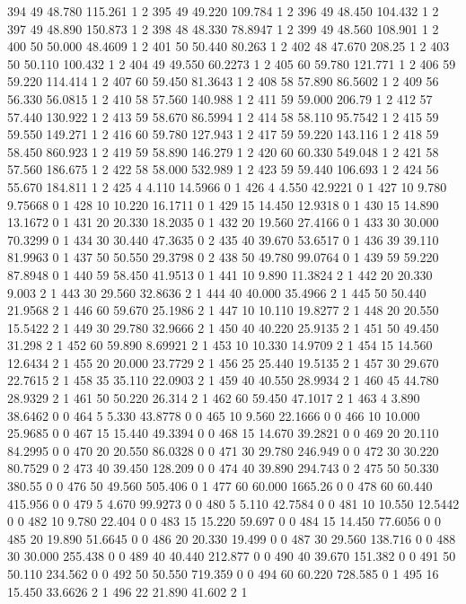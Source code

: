 {394 49 48.780 115.261 1 2
395 49 49.220 109.784 1 2
396 49 48.450 104.432 1 2
397 49 48.890 150.873 1 2
398 48 48.330 78.8947 1 2
399 49 48.560 108.901 1 2
400 50 50.000 48.4609 1 2
401 50 50.440 80.263 1 2
402 48 47.670 208.25 1 2
403 50 50.110 100.432 1 2
404 49 49.550 60.2273 1 2
405 60 59.780 121.771 1 2
406 59 59.220 114.414 1 2
407 60 59.450 81.3643 1 2
408 58 57.890 86.5602 1 2
409 56 56.330 56.0815 1 2
410 58 57.560 140.988 1 2
411 59 59.000 206.79 1 2
412 57 57.440 130.922 1 2
413 59 58.670 86.5994 1 2
414 58 58.110 95.7542 1 2
415 59 59.550 149.271 1 2
416 60 59.780 127.943 1 2
417 59 59.220 143.116 1 2
418 59 58.450 860.923 1 2
419 59 58.890 146.279 1 2
420 60 60.330 549.048 1 2
421 58 57.560 186.675 1 2
422 58 58.000 532.989 1 2
423 59 59.440 106.693 1 2
424 56 55.670 184.811 1 2
425 4 4.110 14.5966 0 1
426 4 4.550 42.9221 0 1
427 10 9.780 9.75668 0 1
428 10 10.220 16.1711 0 1
429 15 14.450 12.9318 0 1
430 15 14.890 13.1672 0 1
431 20 20.330 18.2035 0 1
432 20 19.560 27.4166 0 1
433 30 30.000 70.3299 0 1
434 30 30.440 47.3635 0 2
435 40 39.670 53.6517 0 1
436 39 39.110 81.9963 0 1
437 50 50.550 29.3798 0 2
438 50 49.780 99.0764 0 1
439 59 59.220 87.8948 0 1
440 59 58.450 41.9513 0 1
441 10 9.890 11.3824 2 1
442 20 20.330 9.003 2 1
443 30 29.560 32.8636 2 1
444 40 40.000 35.4966 2 1
445 50 50.440 21.9568 2 1
446 60 59.670 25.1986 2 1
447 10 10.110 19.8277 2 1
448 20 20.550 15.5422 2 1
449 30 29.780 32.9666 2 1
450 40 40.220 25.9135 2 1
451 50 49.450 31.298 2 1
452 60 59.890 8.69921 2 1
453 10 10.330 14.9709 2 1
454 15 14.560 12.6434 2 1
455 20 20.000 23.7729 2 1
456 25 25.440 19.5135 2 1
457 30 29.670 22.7615 2 1
458 35 35.110 22.0903 2 1
459 40 40.550 28.9934 2 1
460 45 44.780 28.9329 2 1
461 50 50.220 26.314 2 1
462 60 59.450 47.1017 2 1
463 4 3.890 38.6462 0 0
464 5 5.330 43.8778 0 0
465 10 9.560 22.1666 0 0
466 10 10.000 25.9685 0 0
467 15 15.440 49.3394 0 0
468 15 14.670 39.2821 0 0
469 20 20.110 84.2995 0 0
470 20 20.550 86.0328 0 0
471 30 29.780 246.949 0 0
472 30 30.220 80.7529 0 2
473 40 39.450 128.209 0 0
474 40 39.890 294.743 0 2
475 50 50.330 380.55 0 0
476 50 49.560 505.406 0 1
477 60 60.000 1665.26 0 0
478 60 60.440 415.956 0 0
479 5 4.670 99.9273 0 0
480 5 5.110 42.7584 0 0
481 10 10.550 12.5442 0 0
482 10 9.780 22.404 0 0
483 15 15.220 59.697 0 0
484 15 14.450 77.6056 0 0
485 20 19.890 51.6645 0 0
486 20 20.330 19.499 0 0
487 30 29.560 138.716 0 0
488 30 30.000 255.438 0 0
489 40 40.440 212.877 0 0
490 40 39.670 151.382 0 0
491 50 50.110 234.562 0 0
492 50 50.550 719.359 0 0
494 60 60.220 728.585 0 1
495 16 15.450 33.6626 2 1
496 22 21.890 41.602 2 1
}
